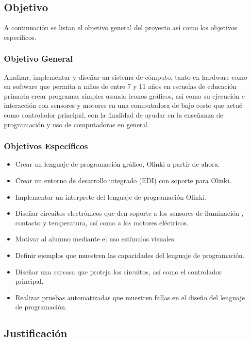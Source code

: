 \documentclass[letterpaper,10pt]{article}
\begin{document}
\subsection{Objetivo}

A continuación se listan el objetivo general del proyecto así como los 
objetivos específicos.

\subsubsection{Objetivo General}
Analizar, implementar y diseñar un sistema de cómputo, tanto en hardware como
en software que permita a niños de entre 7 y 11 años en escuelas de educación
primaria crear programas simples
usando iconos gráficos, así como su ejecución e interacción con sensores y motores
en una computadora de bajo costo que actué como controlador principal, 
con la finalidad de ayudar en la enseñanza de programación y uso de computadoras 
en general.

\subsubsection{Objetivos Específicos}

\begin{itemize}
 \item Crear un lenguaje de programación gráfico, Olinki a partir de ahora.
 \item Crear un entorno de desarrollo integrado (EDI) con soporte para Olinki.
 \item Implementar un interprete del lenguaje de programación Olinki.
 \item Diseñar circuitos electrónicos que den soporte a los sensores de iluminación
 , contacto y temperatura, así como a los motores eléctricos.
 \item Motivar al alumno mediante el uso estímulos visuales.
 \item Definir ejemplos que muestren las capacidades del lenguaje de programación.
 \item Diseñar una carcasa que proteja los circuitos, así como el controlador 
 principal.
 \item Realizar pruebas automatizadas que muestren fallas en el diseño del lenguaje 
 de programación.
\end{itemize}

\subsection{Justificación}
\end{document}
